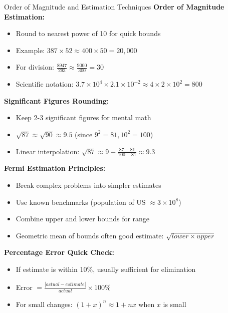 \documentclass{article}
\begin{document}
\begin{mentalbox}{Order of Magnitude and Estimation Techniques}
\textbf{Order of Magnitude Estimation:}
\begin{itemize}[nosep]
\item Round to nearest power of 10 for quick bounds
\item Example: $387 \times 52 \approx 400 \times 50 = 20,000$
\item For division: $\frac{8947}{293} \approx \frac{9000}{300} = 30$
\item Scientific notation: $3.7 \times 10^4 \times 2.1 \times 10^{-2} \approx 4 \times 2 \times 10^2 = 800$
\end{itemize}

\textbf{Significant Figures Rounding:}
\begin{itemize}[nosep]
\item Keep 2-3 significant figures for mental math
\item $\sqrt{87} \approx \sqrt{90} \approx 9.5$ (since $9^2 = 81, 10^2 = 100$)
\item Linear interpolation: $\sqrt{87} \approx 9 + \frac{87-81}{100-81} \approx 9.3$
\end{itemize}

\textbf{Fermi Estimation Principles:}
\begin{itemize}[nosep]
\item Break complex problems into simpler estimates
\item Use known benchmarks (population of US $\approx 3 \times 10^8$)
\item Combine upper and lower bounds for range
\item Geometric mean of bounds often good estimate: $\sqrt{lower \times upper}$
\end{itemize}

\textbf{Percentage Error Quick Check:}
\begin{itemize}[nosep]
\item If estimate is within 10\%, usually sufficient for elimination
\item Error $= \frac{|actual - estimate|}{actual} \times 100\%$
\item For small changes: $(1+x)^n \approx 1 + nx$ when $x$ is small
\end{itemize}
\end{mentalbox}
\end{document}
